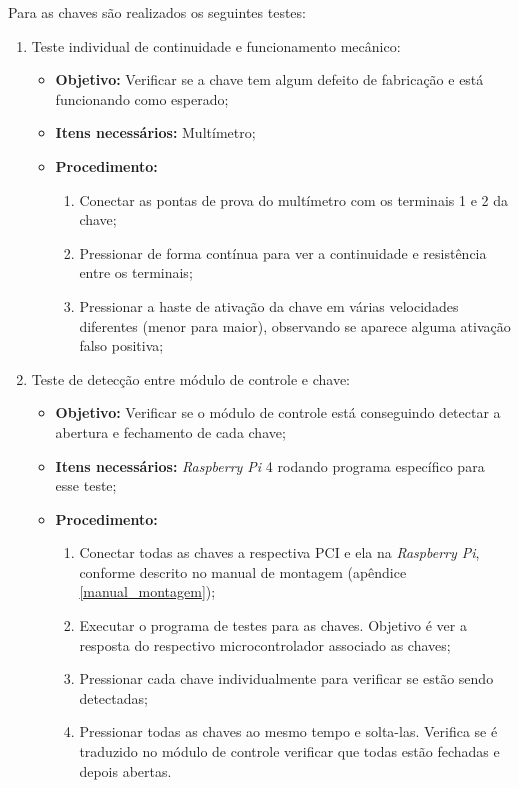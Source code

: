 Para as chaves são realizados os seguintes testes:

\begin{enumerate}
    \item Teste individual de continuidade e funcionamento mecânico:
    
    \begin{itemize}
        \item \textbf{Objetivo:} Verificar se a chave tem algum defeito de fabricação e está funcionando como esperado;
        \item \textbf{Itens necessários:} Multímetro;
        \item \textbf{Procedimento:} 
        \begin{enumerate}
            \item Conectar as pontas de prova do multímetro com os terminais 1 e 2 da chave;
            \item Pressionar de forma contínua para ver a continuidade e resistência entre os terminais;
            \item Pressionar a haste de ativação da chave em várias velocidades diferentes (menor para maior), observando se aparece alguma ativação falso positiva;
        \end{enumerate}
    \end{itemize}
    
    \item Teste de detecção entre módulo de controle e chave:
    
    \begin{itemize}
        \item \textbf{Objetivo:} Verificar se o módulo de controle está conseguindo detectar a abertura e fechamento de cada chave;
        \item \textbf{Itens necessários:} \textit{Raspberry Pi} 4 rodando programa específico para esse teste;
        \item \textbf{Procedimento:} 
        \begin{enumerate}
            \item Conectar todas as chaves a respectiva PCI e ela na \textit{Raspberry Pi}, conforme descrito no manual de montagem (apêndice \ref{manual_montagem});
            \item Executar o programa de testes para as chaves. Objetivo é ver a resposta do respectivo microcontrolador associado as chaves;
            \item Pressionar cada chave individualmente para verificar se estão sendo detectadas;
            \item Pressionar todas as chaves ao mesmo tempo e solta-las. Verifica se é traduzido no módulo de controle verificar que todas estão fechadas e depois abertas.
        \end{enumerate}
    \end{itemize}
    
\end{enumerate}

